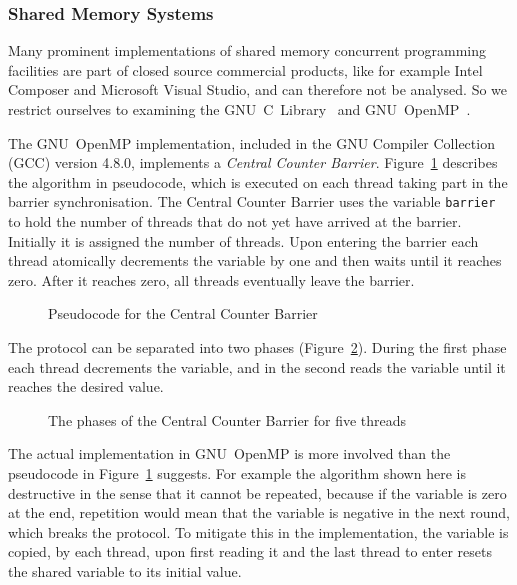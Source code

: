 \documentclass[a4paper, 10pt]{article}
\begin{document}
\subsubsection{Shared Memory Systems}
\label{sssec:background-current-shared}

Many prominent implementations of shared memory concurrent programming facilities are part of closed source commercial products, like for example Intel Composer and Microsoft Visual Studio, and can therefore not be analysed. So we restrict ourselves to examining the GNU~C~Library~\cite{glibc} and GNU~OpenMP~\cite{gomp}.

The GNU~OpenMP implementation, included in the GNU Compiler Collection (GCC) version 4.8.0, implements a \emph{Central Counter Barrier}. Figure~\ref{fig:pseudocode-central-counter} describes the algorithm in pseudocode, which is executed on each thread taking part in the barrier synchronisation.
The Central Counter Barrier uses the variable \texttt{barrier} to hold the number of threads that do not yet have arrived at the barrier. Initially it is assigned the number of threads. Upon entering the barrier each thread atomically decrements the variable by one and then waits until it reaches zero. After it reaches zero, all threads eventually leave the barrier.

\begin{figure}[H]
	\centering
	
	\caption{Pseudocode for the Central Counter Barrier}
	\label{fig:pseudocode-central-counter}
\end{figure}

The protocol can be separated into two phases (Figure~\ref{fig:diagram-central-counter}). During the first phase each thread decrements the variable, and in the second reads the variable until it reaches the desired value.

\begin{figure}[H]
	\centering
	
	\caption{The phases of the Central Counter Barrier for five threads}
	\label{fig:diagram-central-counter}
\end{figure}

The actual implementation in GNU~OpenMP is more involved than the pseudocode in Figure~\ref{fig:pseudocode-central-counter} suggests. For example the algorithm shown here is destructive in the sense that it cannot be repeated, because if the variable is zero at the end, repetition would mean that the variable is negative in the next round, which breaks the protocol. To mitigate this in the implementation, the variable is copied, by each thread, upon first reading it and the last thread to enter resets the shared variable to its initial value.
\end{document}
